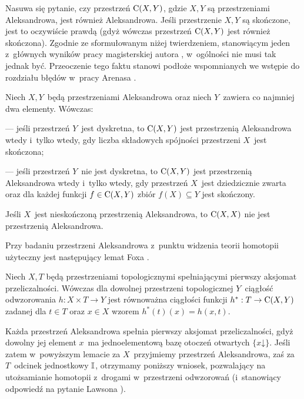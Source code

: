 Nasuwa się pytanie, czy przestrzeń $\operatorname{C}(X,Y)$, gdzie $X,Y$ są przestrzeniami Aleksandrowa, jest również Aleksandrowa. Jeśli przestrzenie $X,Y$ są skończone, jest to oczywiście prawdą (gdyż wówczas przestrzeń $\operatorname{C}(X,Y)$ jest również skończona). Zgodnie ze sformułowanym niżej twierdzeniem, stanowiącym jeden z~głównych wyników pracy magisterskiej autora \cite{Kukiela10}, w~ogólności nie musi tak jednak być. Przeoczenie tego faktu stanowi podłoże wspomnianych we wstępie do rozdziału błędów w~pracy Arenasa \cite{Arenas99}.
\begin{tw}\label{tw-kukiely-kiedy_cxy_aleksandrowa}
Niech $X,Y$~będą przestrzeniami Aleksandrowa oraz niech $Y$~zawiera co najmniej dwa elementy. Wówczas:
\begin{compactitem}
\item[---] jeśli przestrzeń $Y$~jest dyskretna, to $\operatorname{C}(X,Y)$ jest przestrzenią Aleksandrowa wtedy i~tylko wtedy, gdy liczba składowych spójności przestrzeni $X$~jest skończona;
\item[---] jeśli przestrzeń $Y$~nie jest dyskretna, to $\operatorname{C}(X,Y)$ jest przestrzenią Aleksandrowa wtedy i~tylko wtedy, gdy przestrzeń $X$~jest dziedzicznie zwarta oraz dla każdej funkcji $f\in \operatorname{C}(X,Y)$ zbiór $f(X)\subseteq Y$ jest skończony. 
\end{compactitem}
\end{tw}
\begin{wn}
Jeśli $X$~jest nieskończoną przestrzenią Aleksandrowa, to $\operatorname{C}(X,X)$ nie jest przestrzenią Aleksandrowa.
\end{wn}

Przy badaniu przestrzeni Aleksandrowa z~punktu widzenia teorii homotopii użyteczny jest następujący lemat Foxa \cite{Fox45}.

\begin{lem}
Niech $X,T$ będą przestrzeniami topologicznymi spełniającymi pierwszy aksjomat przeliczalności. Wówczas dla dowolnej przestrzeni topologicznej $Y$~ciągłość odwzorowania $h:X\times T\to Y$ jest równoważna ciągłości funkcji $h^{*}:T\to \operatorname{C}(X,Y)$ zadanej dla $t\in T$ oraz $x\in X$ wzorem $h^*(t)(x)=h(x,t)$.
\end{lem}

Każda przestrzeń Aleksandrowa spełnia pierwszy aksjomat przeliczalności, gdyż dowolny jej element $x$~ma jednoelementową bazę otoczeń otwartych $\{x\mathord{\downarrow}\}$. Jeśli zatem w~powyższym lemacie za $X$~przyjmiemy przestrzeń Aleksandrowa, zaś za $T$~odcinek jednostkowy $\mathbb{I}$, otrzymamy poniższy wniosek, pozwalający na utożsamianie homotopii z~drogami w~przestrzeni odwzorowań (i~stanowiący odpowiedź na pytanie Lawsona \cite[p.~837]{Rival82}).

